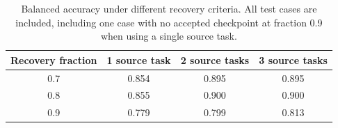 \begin{table}[htbp]
\centering
\caption{Balanced accuracy under different recovery criteria. All test cases
are included, including one case with no accepted checkpoint at fraction 0.9
when using a single source task.}
\label{tab:recovery-fraction-sensitivity}
\small
\begin{tabular}{cccc}
\toprule
Recovery fraction & 1 source task & 2 source tasks & 3 source tasks \\
\midrule
0.7 & 0.854 & 0.895 & 0.895 \\
0.8 & 0.855 & 0.900 & 0.900 \\
0.9 & 0.779 & 0.799 & 0.813 \\
\bottomrule
\end{tabular}
\end{table}

